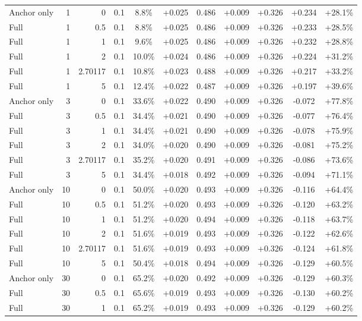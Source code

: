 \begin{table}[htbp]
\begin{tabular}{lrrrccccccc}
Anchor only & 1 & 0 & 0.1 & 8.8\% & +0.025 & 0.486 & +0.009 & +0.326 & +0.234 & +28.1\% \\
Full & 1 & 0.5 & 0.1 & 8.8\% & +0.025 & 0.486 & +0.009 & +0.326 & +0.233 & +28.5\% \\
Full & 1 & 1 & 0.1 & 9.6\% & +0.025 & 0.486 & +0.009 & +0.326 & +0.232 & +28.8\% \\
Full & 1 & 2 & 0.1 & 10.0\% & +0.024 & 0.486 & +0.009 & +0.326 & +0.224 & +31.2\% \\
Full & 1 & 2.70117 & 0.1 & 10.8\% & +0.023 & 0.488 & +0.009 & +0.326 & +0.217 & +33.2\% \\
Full & 1 & 5 & 0.1 & 12.4\% & +0.022 & 0.487 & +0.009 & +0.326 & +0.197 & +39.6\% \\
Anchor only & 3 & 0 & 0.1 & 33.6\% & +0.022 & 0.490 & +0.009 & +0.326 & -0.072 & +77.8\% \\
Full & 3 & 0.5 & 0.1 & 34.4\% & +0.021 & 0.490 & +0.009 & +0.326 & -0.077 & +76.4\% \\
Full & 3 & 1 & 0.1 & 34.4\% & +0.021 & 0.490 & +0.009 & +0.326 & -0.078 & +75.9\% \\
Full & 3 & 2 & 0.1 & 34.0\% & +0.020 & 0.490 & +0.009 & +0.326 & -0.081 & +75.2\% \\
Full & 3 & 2.70117 & 0.1 & 35.2\% & +0.020 & 0.491 & +0.009 & +0.326 & -0.086 & +73.6\% \\
Full & 3 & 5 & 0.1 & 34.4\% & +0.018 & 0.492 & +0.009 & +0.326 & -0.094 & +71.1\% \\
Anchor only & 10 & 0 & 0.1 & 50.0\% & +0.020 & 0.493 & +0.009 & +0.326 & -0.116 & +64.4\% \\
Full & 10 & 0.5 & 0.1 & 51.2\% & +0.020 & 0.493 & +0.009 & +0.326 & -0.120 & +63.2\% \\
Full & 10 & 1 & 0.1 & 51.2\% & +0.020 & 0.494 & +0.009 & +0.326 & -0.118 & +63.7\% \\
Full & 10 & 2 & 0.1 & 51.6\% & +0.019 & 0.493 & +0.009 & +0.326 & -0.122 & +62.6\% \\
Full & 10 & 2.70117 & 0.1 & 51.6\% & +0.019 & 0.493 & +0.009 & +0.326 & -0.124 & +61.8\% \\
Full & 10 & 5 & 0.1 & 50.4\% & +0.018 & 0.494 & +0.009 & +0.326 & -0.129 & +60.5\% \\
Anchor only & 30 & 0 & 0.1 & 65.2\% & +0.020 & 0.492 & +0.009 & +0.326 & -0.129 & +60.3\% \\
Full & 30 & 0.5 & 0.1 & 65.6\% & +0.019 & 0.493 & +0.009 & +0.326 & -0.130 & +60.2\% \\
Full & 30 & 1 & 0.1 & 65.2\% & +0.019 & 0.493 & +0.009 & +0.326 & -0.129 & +60.2\% \\

\end{tabular}
\end{table}
